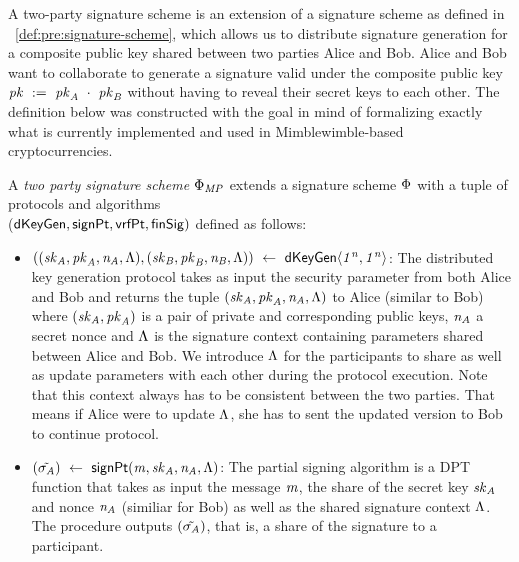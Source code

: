 A two-party signature scheme is an extension of a signature scheme as defined in ~\cref{def:pre:signature-scheme}, which allows us to distribute signature generation for a composite public key shared between two parties Alice and Bob.
Alice and Bob want to collaborate to generate a signature valid under the composite public key $\mathit{pk} ~:=~ \mathit{pk}_{\mathit{A}} ~\cdot~ \mathit{pk}_{\mathit{B}}$ without having to reveal their secret keys to each other.
The definition below was constructed with the goal in mind of formalizing exactly what is currently implemented and used in Mimblewimble-based cryptocurrencies.

\begin{definition}
    \label{def:sig:two-party-sig}

    A \emph{two party signature scheme $\Phi_{\mathit{MP}}$} extends a signature scheme $\Phi$ with a tuple of protocols and algorithms\\
    ($\mathsf{dKeyGen}, \mathsf{signPt} , \mathsf{vrfPt}, \mathsf{finSig})$ defined as follows:

    \begin{itemize}
        \item $((\mathit{sk}_{\mathit{A}}, \mathit{pk}_{\mathit{A}}, \mathit{\mathit{n}_{\mathit{A}}}, \Lambda), (\mathit{sk}_{\mathit{B}}, \mathit{pk}_{\mathit{B}}, \mathit{\mathit{n}_{\mathit{B}}}, \Lambda)) ~\leftarrow~ \mathsf{dKeyGen}\langle \mathit{1^n}, \mathit{1^n} \rangle$: The distributed key generation protocol takes as input the security parameter from both Alice and Bob and returns
        the tuple $(\mathit{sk}_{\mathit{A}}, \mathit{pk}_{\mathit{A}}, \mathit{\mathit{n}_{\mathit{A}}}, \Lambda)$ to Alice (similar to Bob) where $(\mathit{sk}_{\mathit{A}}, \mathit{pk}_{\mathit{A}})$ is a pair of private and corresponding public keys, $\mathit{\mathit{n}_{\mathit{A}}}$ a secret nonce and $\Lambda$ is the signature context containing parameters shared between Alice and Bob.
        We introduce $\Lambda$ for the participants to share as well as update parameters with each other during the protocol execution.
        Note that this context always has to be consistent between the two parties.
        That means if Alice were to update $\Lambda$, she has to sent the updated version to Bob to continue protocol.

        \item $(\tilde{\sigma_{\mathit{A}}}) ~\leftarrow~ \mathsf{signPt}(\mathit{m}, \mathit{sk}_{\mathit{A}}, \mathit{\mathit{n}_{\mathit{A}}}, \Lambda)$: The partial signing algorithm is a DPT function that takes as input the message $\mathit{m}$, the share of the secret key $\mathit{sk}_{\mathit{A}}$ and nonce $\mathit{\mathit{n}_{\mathit{A}}}$ (similiar for Bob) as well
        as the shared signature context $\Lambda$. The procedure outputs $(\tilde{\sigma_{\mathit{A}}})$, that is, a share of the signature to a participant.


\end{itemize}
\end{definition}
